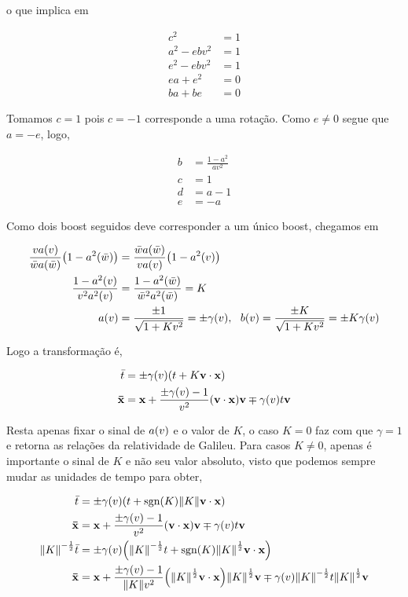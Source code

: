 \documentclass[twoside]{amsart}
\newcommand{\sgn}[1]{\mbox{sgn}\qty(#1)}
\numberwithin{equation}{section}
\begin{document}
o que implica em

\begin{align}
    c^2&=1\\
    a^2-ebv^2&=1\\
    e^2-ebv^2&=1\\
    ea+e^2&=0\\
    ba+be&=0
\end{align}

Tomamos $c=1$ pois $c=-1$ corresponde a uma rotação. Como $e\neq 0$ segue que $a=-e$, logo,

\begin{align}
    b&=\frac{1-a^2}{av^2}\\
    c&=1\\
    d&=a-1\\
    e&=-a
\end{align}

Como dois boost seguidos deve corresponder a um único boost, chegamos em

\begin{align}
    \frac{va\qty(v)}{\bar wa\qty(\bar w)}\qty(1-a^2\qty(\bar w))&=\frac{\bar wa\qty(\bar w)}{va\qty(v)}\qty(1-a^2\qty(v))\\
    \frac{1-a^2\qty(v)}{v^2a^2\qty(v)}&=\frac{1-a^2\qty(\bar w)}{{\bar w}^2a^2\qty({\bar w})}=K\\
    a\qty(v)&=\frac{\pm 1}{\sqrt{1+Kv^2}}=\pm \gamma\qty(v),\ \ b\qty(v)=\frac{\pm K}{\sqrt{1+Kv^2}}=\pm K\gamma\qty(v) 
\end{align}

Logo a transformação é,

\begin{align}
    {\bar t}&=\pm\gamma\qty(v)\qty(t+K\vb v \cdot \vb x)\\
    \vb {\bar x}&= \vb x+\frac{\pm\gamma\qty(v)-1}{v^2}\qty(\vb v \cdot \vb x)\vb v\mp\gamma\qty(v)t \vb v
\end{align}

Resta apenas fixar o sinal de $a\qty(v)$ e o valor de $K$, o caso $K=0$ faz com que $\gamma=1$ e retorna as relações da relatividade de Galileu. Para casos $K\neq 0$, apenas é importante o sinal de $K$ e não seu valor absoluto, visto que podemos sempre mudar as unidades de tempo para obter,

\begin{align}
    {\bar t}&=\pm\gamma\qty(v)\qty(t+\sgn{K}\norm{K}\vb v \cdot \vb x)\\
    \vb {\bar x}&= \vb x+\frac{\pm\gamma\qty(v)-1}{v^2}\qty(\vb v \cdot \vb x)\vb v\mp\gamma\qty(v)t \vb v\\
    \norm{K}^{-\frac12}{\bar t}&=\pm\gamma\qty(v)\qty(\norm{K}^{-\frac12}t+\sgn{K}\norm{K}^\frac12\vb v \cdot \vb x)\\
    \vb {\bar x}&= \vb x+\frac{\pm\gamma\qty(v)-1}{\norm{K}v^2}\qty(\norm{K}^\frac12\vb v \cdot \vb x)\norm{K}^\frac12\vb v\mp\gamma\qty(v)\norm{K}^{-\frac12}t \norm{K}^\frac12\vb v 
\end{align}
\end{document}
